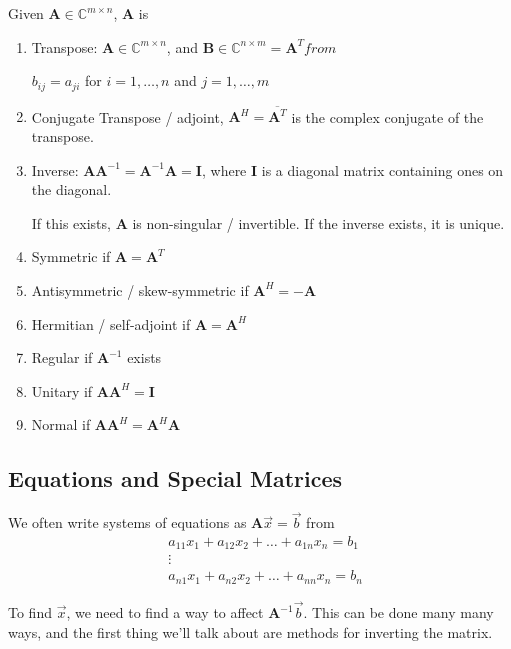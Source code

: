 \documentclass[12pt]{article}
\newcommand{\ve}[1]{\ensuremath{\mathbf{#1}}}
\newcommand{\cc}[1]{\ensuremath{\overline{#1}}}
\begin{document}
Given $\ve{A} \in \mathbb{C}^{m \times n}$, \ve{A} is
%
\begin{enumerate}
\item Transpose: $\ve{A} \in \mathbb{C}^{m \times n}$, and $\ve{B} \in \mathbb{C}^{n \times m} = \ve{A}^T from$

$b_{	ij} = a_{ji}$ for $i = 1, \dots, n$ and $j = 1, \dots, m$

\item Conjugate Transpose / adjoint, $\ve{A}^H = \cc{\ve{A}^T}$ is the complex conjugate of the transpose. 

\item Inverse: $\ve{AA}^{-1} = \ve{A}^{-1}\ve{A} = \ve{I}$, where $\ve{I}$ is a diagonal matrix containing ones on the diagonal.

If this exists, $\ve{A}$ is non-singular / invertible. If the inverse exists, it is unique.

\item Symmetric if $\ve{A} = \ve{A}^T$

\item Antisymmetric / skew-symmetric if $\ve{A}^H = -\ve{A}$

\item Hermitian / self-adjoint if $\ve{A} = \ve{A}^H$

\item Regular if $\ve{A}^{-1}$ exists

\item Unitary if $\ve{A}\ve{A}^H = \ve{I}$

\item Normal if $\ve{A}\ve{A}^H = \ve{A}^H\ve{A}$
\end{enumerate}


\subsection{Equations and Special Matrices}

We often write systems of equations as $\ve{A}\vec{x} = \vec{b}$ from
\begin{align}
&a_{11} x_1 + a_{12} x_2 + \dots + a_{1n} x_n = b_1 \nonumber \\
&\vdots \nonumber \\
&a_{n1} x_1 + a_{n2} x_2 + \dots + a_{nn} x_n = b_n \nonumber
\end{align}

To find $\vec{x}$, we need to find a way to affect $\ve{A}^{-1}\vec{b}$. This can be done many many ways, and the first thing we'll talk about are methods for inverting the matrix.
\end{document}
